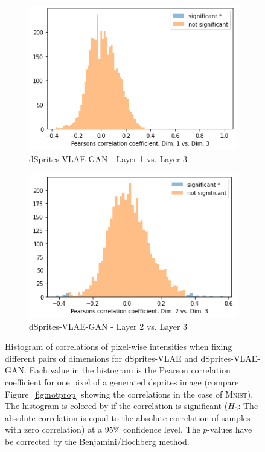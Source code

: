\begin{figure}
\begin{subfigure}{.3\textwidth}
        \includegraphics[width=\textwidth]{images/notprop/dsprites/vlae_gan/dim_1_3.png}
        \caption{dSprites-\ac{VLAE}-\ac{GAN} - Layer 1 vs. Layer 3}
    \end{subfigure}
    \hfill
    \begin{subfigure}{.3\textwidth}
        \includegraphics[width=\textwidth]{images/notprop/dsprites/vlae_gan/dim_2_3.png}
        \caption{dSprites-\ac{VLAE}-\ac{GAN} - Layer 2 vs. Layer 3}
    \end{subfigure}
    \caption[dSprites-\ac{VLAE} and dSprites-\ac{VLAE}-\ac{GAN} - Pixel intensity correlation]{Histogram of correlations of pixel-wise intensities when fixing different pairs of dimensions for dSprites-\ac{VLAE} and dSprites-\ac{VLAE}-\ac{GAN}.
    Each value in the histogram is the Pearson correlation coefficient for one pixel of a generated dsprites image (compare Figure~\ref{fig:notprop} showing the correlations in the case of \textsc{Mnist}).
    The histogram is colored by if the correlation is significant ($H_0$: The absolute correlation is equal to the absolute correlation of samples with zero correlation) at a 95\% confidence level.
    The $p$-values have be corrected by the Benjamini/Hochberg method.}
    \label{fig:dsprites_vlae_notprop}
\end{figure}

